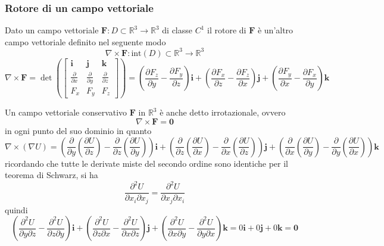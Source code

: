 \documentclass{article}
\newcommand{\mfrac}[2]{\displaystyle\frac{#1}{#2}}
\begin{document}
            \subsubsection{Rotore di un campo vettoriale} 
                Dato un campo vettoriale $\mathbf{F}: D \subset \mathbb{R}^{3} \rightarrow \mathbb{R}^{3}$ di classe $C^{1}$ il rotore di $\mathbf{F}$ è un'altro campo vettoriale definito nel seguente modo 
                \[
                    \nabla \times \mathbf{F}: \text{int}(D) \subset \mathbb{R}^{3} \rightarrow \mathbb{R}^{3} 
                \]
                \[
                    \nabla \times \mathbf{F} = \det\left( \begin{bmatrix}
                        \mathbf{i} & \mathbf{j} & \mathbf{k} \\
                        \mfrac{\partial}{\partial x} & \mfrac{\partial}{\partial y} & \mfrac{\partial}{\partial z} \\
                        F_{x} & F_{y} & F_{z}
                    \end{bmatrix}\right)
                    = \left(\frac{\partial F_{z}}{\partial y} - \frac{\partial F_{y}}{\partial z}\right)\mathbf{i} + \left( \frac{\partial F_{x}}{\partial z} - \frac{\partial F_{z}}{\partial x}\right) \mathbf{j} + \left( \frac{\partial F_{y}}{\partial x} - \frac{\partial F_{x}}{\partial y}\right) \mathbf{k}
                \]

                Un campo vettoriale conservativo $\mathbf{F}$ in $\mathbb{R}^{3}$ è anche detto irrotazionale, ovvero
                \[
                    \nabla \times \mathbf{F} = \mathbf{0}
                \]
                in ogni punto del suo dominio in quanto
                \[
                    \nabla \times (\nabla U) = \left( \frac{\partial}{\partial y} \left( \frac{\partial U}{\partial z} \right) - \frac{\partial}{\partial z} \left( \frac{\partial U}{\partial y}\right) \right) \mathbf{i} + \left( \frac{\partial}{\partial z} \left( \frac{\partial U}{\partial x} \right) - \frac{\partial}{\partial x} \left( \frac{\partial U}{\partial z}\right) \right) \mathbf{j} + \left( \frac{\partial}{\partial x} \left( \frac{\partial U}{\partial y} \right) - \frac{\partial}{\partial y} \left( \frac{\partial U}{\partial x}\right) \right) \mathbf{k}
                \]
                ricordando che tutte le derivate miste del secondo ordine sono identiche per il teorema di Schwarz, si ha
                \[
                    \frac{\partial^{2} U}{\partial x_{i} \partial x_{j}} = \frac{\partial^{2} U}{\partial x_{j} \partial x_{i}}
                \]
                quindi
                \[
                    \left( \frac{\partial^{2} U}{\partial y \partial z} - \frac{\partial^{2} U}{\partial z \partial y} \right) \mathbf{i} + \left( \frac{\partial^{2} U}{\partial z \partial x} -  \frac{\partial^{2} U}{\partial x \partial z} \right) \mathbf{j} + \left( \frac{\partial^{2} U}{\partial x \partial y} -  \frac{\partial^{2} U}{\partial y \partial x} \right) \mathbf{k} = 0 \mathbf{i} + 0 \mathbf{j} + 0 \mathbf{k} = \mathbf{0}
                \]
\end{document}
